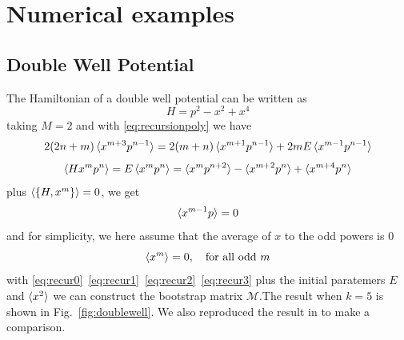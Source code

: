 \documentclass[aps,prl, preprint,amsmath, amssymb]{revtex4-2}
\begin{document}
\section{Numerical examples}
\subsection {Double Well Potential}
The Hamiltonian of a double well potential can be written as
\begin{equation}
    H = p^2 - x^2 + x^4
\end{equation}
taking $M = 2$ and with \eqref{eq:recursionpoly} we have
\begin{equation}
    2(2n + m)\braket{x^{m + 3} p^{n - 1}} = 2(m + n)\braket{x^{m + 1} p^{n - 1}} + 2mE\braket{x^{m - 1} p^{n - 1}} \label{eq:recur0}
\end{equation}
\begin{equation}
    \braket{Hx^m p^n} = E\braket{x^m p^n} = \braket{x^m p^{n + 2}} - \braket{x^{m + 2} p^n} + \braket{x^{m + 4} p^n} \label{eq:recur1}
\end{equation}
plus $\braket{\{H, x^m\}} = 0$, we get
\begin{equation}
    \braket{x^{m - 1} p} = 0 \label{eq:recur2}
\end{equation}
and for simplicity, we here assume that the average of $x$ to the odd powers is $0$ 
\begin{equation}
    \braket{x^m} = 0,\ \ \ \text{for all odd}\ m \label{eq:recur3}
\end{equation}
with \eqref{eq:recur0}~\eqref{eq:recur1}~\eqref{eq:recur2}~\eqref{eq:recur3} plus the initial paratemers $E$ and $\braket{x^2}$ we can construct the bootstrap matrix $\bm{\mathcal{M}}$.The result when $k = 5$ is shown in Fig.~\ref{fig:doublewell}. We also reproduced the result in \cite{Nakayama_2022} to make a comparison.
\end{document}

